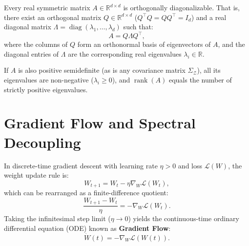 \documentclass[11pt, oneside, openany]{book}
\DeclareMathOperator{\rank}{rank}
\DeclareMathOperator{\diag}{diag}
\begin{document}
\begin{theorem}
\label{thm:B.1}
Every real symmetric matrix $A \in \mathbb{R}^{d \times d}$ is orthogonally diagonalizable. That is, there exist an orthogonal matrix $Q \in \mathbb{R}^{d \times d}$ ($Q^{\top} Q = Q Q^{\top} = I_{d}$) and a real diagonal matrix $\Lambda = \diag(\lambda_{1}, \dots, \lambda_{d})$ such that:
\begin{equation}
\label{eq:B.5}
A = Q \Lambda Q^{\top},
\end{equation}
where the columns of $Q$ form an orthonormal basis of eigenvectors of $A$, and the diagonal entries of $\Lambda$ are the corresponding real eigenvalues $\lambda_{i} \in \mathbb{R}$.
\end{theorem}

If $A$ is also positive semidefinite (as is any covariance matrix $\Sigma_{\mathcal{Z}}$), all its eigenvalues are non-negative ($\lambda_{i} \geq 0$), and $\rank(A)$ equals the number of strictly positive eigenvalues.

\section{Gradient Flow and Spectral Decoupling}
\label{sec:B.3}

In discrete-time gradient descent with learning rate $\eta > 0$ and loss $\mathcal{L}(W)$, the weight update rule is:
\begin{equation}
\label{eq:B.6}
W_{t+1} = W_{t} - \eta \nabla_{W} \mathcal{L}(W_{t}),
\end{equation}
which can be rearranged as a finite-difference quotient:
\begin{equation}
\label{eq:B.7}
\frac{W_{t+1} - W_{t}}{\eta} = -\nabla_{W} \mathcal{L}(W_{t}).
\end{equation}
Taking the infinitesimal step limit ($\eta \to 0$) yields the continuous-time ordinary differential equation (ODE) known as \textbf{Gradient Flow}:
\begin{equation}
\label{eq:B.8}
\dot{W}(t) = -\nabla_{W} \mathcal{L}(W(t)).
\end{equation}
\end{document}
